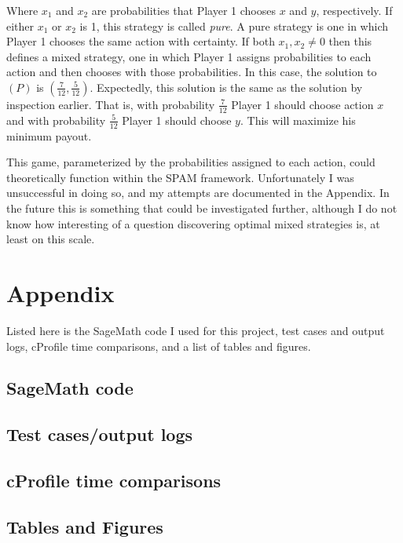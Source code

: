 \documentclass{article}
\begin{document}
Where $x_{1}$ and $x_{2}$ are probabilities that Player 1 chooses $x$ and $y$, respectively. If either $x_{1}$ or $x_{2}$ is 1, this strategy is called \textit{pure}. A pure strategy is one in which Player 1 chooses the same action with certainty. If both $x_{1}, x_{2} \ne 0$ then this defines a mixed strategy, one in which Player 1 assigns probabilities to each action and then chooses with those probabilities. In this case, the solution to $(P)$ is $(\frac{7}{12}, \frac{5}{12})$. Expectedly, this solution is the same as the solution by inspection earlier. That is, with probability $\frac{7}{12}$ Player 1 should choose action $x$ and with probability $\frac{5}{12}$ Player 1 should choose $y$. This will maximize his minimum payout.

This game, parameterized by the probabilities assigned to each action, could theoretically function within the SPAM framework. Unfortunately I was unsuccessful in doing so, and my attempts are documented in the Appendix. In the future this is something that could be investigated further, although I do not know how interesting of a question discovering optimal mixed strategies is, at least on this scale.

\pagebreak

\section{Appendix}

Listed here is the SageMath code I used for this project, test cases and output logs, cProfile time comparisons, and a list of tables and figures.

\subsection{SageMath code}
\subsection{Test cases/output logs}
\subsection{cProfile time comparisons}
\subsection{Tables and Figures}
\end{document}
